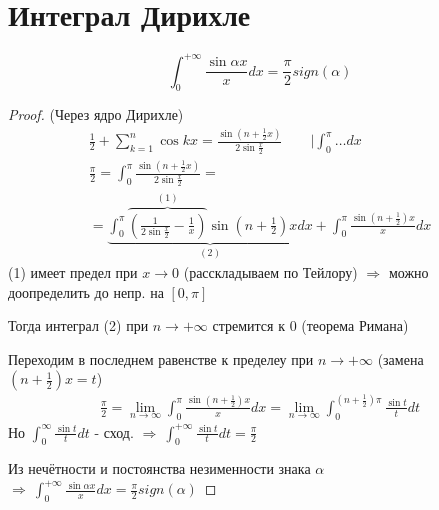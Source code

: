\documentclass{article}
\theoremstyle{definition}
\numberwithin{theorem}{section}
\numberwithin{lemma}{section}
\numberwithin{definition}{section}
\numberwithin{corollary}{section}
\numberwithin{equation}{section}
\let\implies\Rightarrow
\begin{document}
\section{Интеграл Дирихле}
\begin{lemma}
  \[
    \int_{0}^{+\infty}\frac{\sin \alpha x}{x}dx=\frac{\pi}{2} sign(\alpha)
  \]
\end{lemma}
\begin{proof}
  (Через ядро Дирихле)
  \begin{gather*}
    \frac{1}{2}+\sum_{k=1}^{n}\cos kx = \frac{\sin(n+\frac{1}{2}x)}{2\sin \frac{x}{2}} \qquad \Big|\int_{0}^{\pi}\dots dx \\ 
    \frac{\pi}{2}=\int_{0}^{\pi}\frac{\sin(n+\frac{1}{2}x)}{2\sin \frac{x}{2}} = \\
    = \underbrace{\int_{0}^{\pi}\overbrace{\left(\frac{1}{2\sin \frac{x}{2}}-\frac{1}{x}\right)}^{(1)}\sin(n+\frac{1}{2})xdx}_{(2)} + \int_{0}^{\pi}\frac{\sin (n+\frac{1}{2})x}{x}dx
  \end{gather*}
  (1) имеет предел при $x\to 0$ (расскладываем по Тейлору) $\implies$ можно доопределить до непр. на $[0,\pi]$ 

  Тогда интеграл (2) при $n\to +\infty$ стремится к 0 (теорема Римана)

  Переходим в последнем равенстве к пределеу при $n\to+\infty$ (замена $(n+\frac{1}{2})x=t$)
  \begin{gather*}
    \frac{\pi}{2}=\lim_{n\to \infty}\int_{0}^{\pi}\frac{\sin(n+\frac{1}{2})x}{x}dx=\lim_{n\to\infty}\int_{0}^{(n+\frac{1}{2})\pi}\frac{\sin t}{t}dt
  \end{gather*}
  Но $\int_{0}^{\infty}\frac{\sin t}{t}dt$ - сход. $\implies \ \int_{0}^{+\infty}\frac{\sin t}{t}dt=\frac{\pi}{2}$

  Из нечётности и постоянства незименности знака $\alpha$ $\implies \ \int_{0}^{+\infty}\frac{\sin \alpha x}{x}dx = \frac{\pi}{2}sign(\alpha)$
\end{proof}
\end{document}
